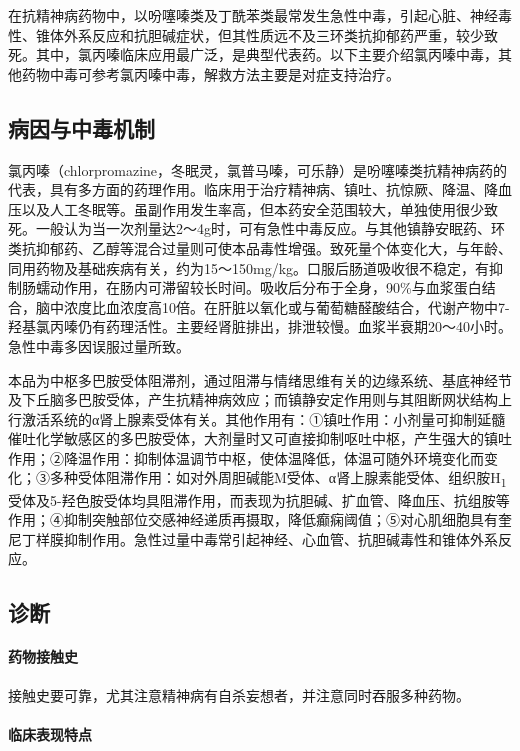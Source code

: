 在抗精神病药物中，以吩噻嗪类及丁酰苯类最常发生急性中毒，引起心脏、神经毒性、锥体外系反应和抗胆碱症状，但其性质远不及三环类抗抑郁药严重，较少致死。其中，氯丙嗪临床应用最广泛，是典型代表药。以下主要介绍氯丙嗪中毒，其他药物中毒可参考氯丙嗪中毒，解救方法主要是对症支持治疗。

\subsection{病因与中毒机制}

氯丙嗪（chlorpromazine，冬眠灵，氯普马嗪，可乐静）是吩噻嗪类抗精神病药的代表，具有多方面的药理作用。临床用于治疗精神病、镇吐、抗惊厥、降温、降血压以及人工冬眠等。虽副作用发生率高，但本药安全范围较大，单独使用很少致死。一般认为当一次剂量达2～4g时，可有急性中毒反应。与其他镇静安眠药、环类抗抑郁药、乙醇等混合过量则可使本品毒性增强。致死量个体变化大，与年龄、同用药物及基础疾病有关，约为15～150mg/kg。口服后肠道吸收很不稳定，有抑制肠蠕动作用，在肠内可滞留较长时间。吸收后分布于全身，90\%与血浆蛋白结合，脑中浓度比血浓度高10倍。在肝脏以氧化或与葡萄糖醛酸结合，代谢产物中7-羟基氯丙嗪仍有药理活性。主要经肾脏排出，排泄较慢。血浆半衰期20～40小时。急性中毒多因误服过量所致。

本品为中枢多巴胺受体阻滞剂，通过阻滞与情绪思维有关的边缘系统、基底神经节及下丘脑多巴胺受体，产生抗精神病效应；而镇静安定作用则与其阻断网状结构上行激活系统的α肾上腺素受体有关。其他作用有：①镇吐作用：小剂量可抑制延髓催吐化学敏感区的多巴胺受体，大剂量时又可直接抑制呕吐中枢，产生强大的镇吐作用；②降温作用：抑制体温调节中枢，使体温降低，体温可随外环境变化而变化；③多种受体阻滞作用：如对外周胆碱能M受体、α肾上腺素能受体、组织胺H\textsubscript{1}
受体及5-羟色胺受体均具阻滞作用，而表现为抗胆碱、扩血管、降血压、抗组胺等作用；④抑制突触部位交感神经递质再摄取，降低癫痫阈值；⑤对心肌细胞具有奎尼丁样膜抑制作用。急性过量中毒常引起神经、心血管、抗胆碱毒性和锥体外系反应。

\subsection{诊断}

\paragraph{药物接触史}

接触史要可靠，尤其注意精神病有自杀妄想者，并注意同时吞服多种药物。

\paragraph{临床表现特点}


